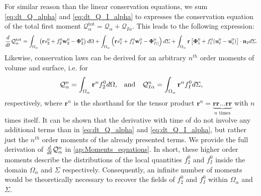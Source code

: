 For similar reason than the linear conservation equations, we sum \ref{eq:dt_Q_alpha} and \ref{eq:dt_Q_I_alpha} to expresses the conservation equation of the total first moment $\mathcal{Q}_\alpha^\text{tot} = \mathcal{Q}_\alpha + \mathcal{Q}_{I\alpha}$.
This leads to the following expression:
\begin{multline}
    \frac{d}{d t} {\mathcal{Q}_\alpha^\text{tot}}
    = \int_{\Omega_\alpha}  \left(
        \textbf{r} s_2^0         
        + f_2^0  \textbf{w}_2^0 
        - \mathbf{\Phi}_2^0
    \right)  d\Omega
    + \int_{\Omega_\alpha}  \left(
        \textbf{r}s_I^0
        + f_I^0 \textbf{w}_I^0
        - \mathbf{\Phi}_{I||}^0
    \right)  d\Sigma
    + \int_{\Omega_\alpha}  \textbf{r} \left[
        \mathbf{\Phi}_1^0
        + f_1^0 (\textbf{u}_I^0-\textbf{u}_1^0)
    \right]\cdot \textbf{n}_2   d\Sigma. 
    \label{eq:dt_Q_alpha_tot}
\end{multline}
Likewise, conservation laws can be derived for an arbitrary $n^{th}$ order moments of volume and surface, i.e. for
\begin{align}
    \mathcal{Q}_\alpha^n
    = \int_{\Omega_\alpha} 
        \textbf{r}^n
        f_2^0  d\Omega,
        && \text{and} &&
    \mathcal{Q}_{I\alpha}^n
    = \int_{\Omega_\alpha} 
        \textbf{r}^n
    f_I^0  d\Sigma,
    \label{eq:Q_n_definition}
\end{align} 
respectively, where $\textbf{r}^n$ is the shorthand for the tensor product $\textbf{r}^n = \underbrace{\textbf{rr}\ldots \textbf{rr}}_{n\text{ times}} $ with $n$ times itself. 
It can be shown that the derivative with time of do not involve any additional terms than in \ref{eq:dt_Q_alpha} and \ref{eq:dt_Q_I_alpha}, but rather just the $n^{th}$ order moments of the already presented terms.
We provide the full derivation of $\frac{d}{d t}{ \mathcal{Q}_\alpha^n}$ in \ref{ap:Moments_equations}.
In short, these higher order moments describe the distributions of the local quantities $f_2^0$ and $f_I^0$ inside the domain $\Omega_\alpha$ and $\Sigma$ respectively.
Consequently, an infinite number of moments would be theoretically necessary to recover the fields of $f_2^0$ and $f_I^0$  within $\Omega_\alpha$ and $\Sigma$. 


